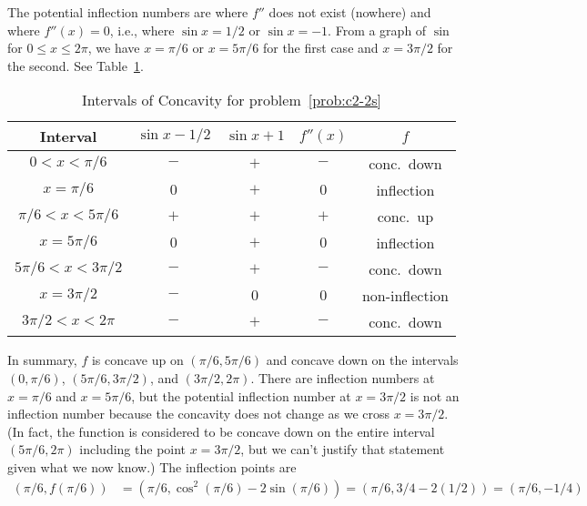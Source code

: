 \documentclass{article}
\begin{document}
\begin{enumerate}
\begin{enumerate}
    The potential inflection numbers are where $f''$ does not exist
    (nowhere) and where $f''(x)=0$, i.e., where $\sin x=1/2$ or
    $\sin x=-1$.  From a graph of $\sin$ for $0\le x\le 2\pi$, we have
    $x=\pi/6$ or $x=5\pi/6$ for the first case and $x=3\pi/2$ for the
    second.  See Table~\ref{tab:c2-2sfpp}.
    \begin{table}[htbp]
      \centering
      \begin{tabular}{|c|c|c|c|c|}
        \hline
        Interval          & $\sin x-1/2$ & $\sin x+1$ & $f''(x)$ & $f$
        \\
        \hline\hline
        $0<x<\pi/6$       & $-$          & $+$        & $-$      & conc.\ down
        \\
        \hline
        $x=\pi/6$         & $0$          & $+$        & $0$      & inflection
        \\
        \hline
        $\pi/6<x<5\pi/6$  & $+$          & $+$        & $+$      & conc.\ up
        \\
        \hline
        $x=5\pi/6$        & $0$          & $+$        & $0$      & inflection
        \\
        \hline
        $5\pi/6<x<3\pi/2$ & $-$          & $+$        & $-$      & conc.\ down
        \\
        \hline
        $x=3\pi/2$        & $-$          & $0$        & $0$     & non-inflection
        \\
        \hline
        $3\pi/2<x<2\pi$   & $-$          & $+$        & $-$      & conc.\ down
        \\
        \hline
      \end{tabular}
      \caption{Intervals of Concavity for problem~\ref{prob:c2-2s}}
      \label{tab:c2-2sfpp}
    \end{table}
    In summary, $f$ is concave up on $(\pi/6,5\pi/6)$ and concave down
    on the intervals $(0,\pi/6)$, $(5\pi/6,3\pi/2)$, and
    $(3\pi/2,2\pi)$.  There are inflection numbers at $x=\pi/6$ and
    $x=5\pi/6$, but the potential inflection number at $x=3\pi/2$ is
    not an inflection number because the concavity does not change as
    we cross $x=3\pi/2$.  (In fact, the function is considered to be
    concave down on the entire interval $(5\pi/6,2\pi)$ including the
    point $x=3\pi/2$, but we can't justify that statement given what
    we now know.)  The inflection points are
    \begin{align*}
      (\pi/6,f(\pi/6))
      &= (\pi/6,\cos^2(\pi/6) - 2\sin(\pi/6)) 
      = (\pi/6,3/4-2(1/2)) = (\pi/6,-1/4)

\end{align*}
\end{enumerate}
\end{enumerate}
\end{document}
